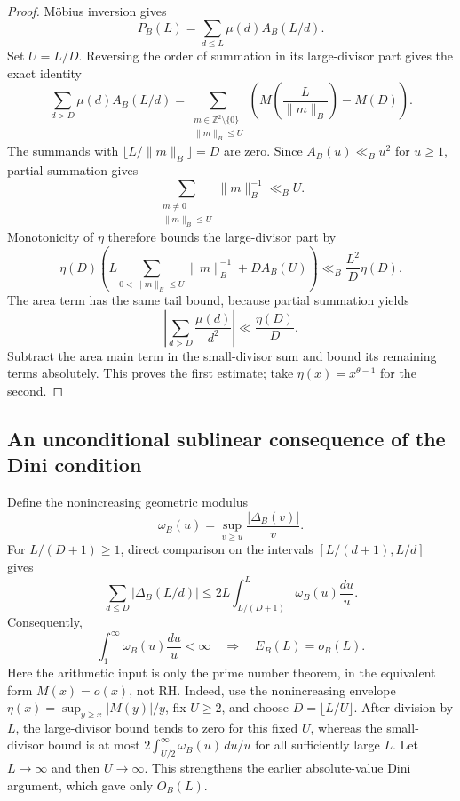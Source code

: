 \begin{proof}
M\"obius inversion gives
\[
 P_B(L)=\sum_{d\le L}\mu(d)A_B(L/d).
\]
Set $U=L/D$.  Reversing the order of summation in its large-divisor
part gives the exact identity
\[
 \sum_{d>D}\mu(d)A_B(L/d)
   =\sum_{\substack{m\in\mathbb Z^2\setminus\{0\}\\\|m\|_B\le U}}
       \left(M\!\left(\frac{L}{\|m\|_B}\right)-M(D)\right).
\]
The summands with $\lfloor L/\|m\|_B\rfloor=D$ are zero.
Since $A_B(u)\ll_B u^2$ for $u\ge1$, partial summation gives
\[
 \sum_{\substack{m\ne0\\\|m\|_B\le U}}\|m\|_B^{-1}\ll_B U.
\]
Monotonicity of $\eta$ therefore bounds the large-divisor part by
\[
 \eta(D)\left(L\sum_{0<\|m\|_B\le U}\|m\|_B^{-1}
                      +D A_B(U)\right)
       \ll_B\frac{L^2}{D}\eta(D).
\]
The area term has the same tail bound, because partial summation yields
\[
 \left|\sum_{d>D}\frac{\mu(d)}{d^2}\right|
       \ll\frac{\eta(D)}{D}.
\]
Subtract the area main term in the small-divisor sum and bound its
remaining terms absolutely.  This proves the first estimate; take
$\eta(x)=x^{\theta-1}$ for the second.
\end{proof}

\subsection{An unconditional sublinear consequence of the Dini condition}
Define the nonincreasing geometric modulus
\[
 \omega_B(u)=\sup_{v\ge u}\frac{|\Delta_B(v)|}{v}.
\]
For $L/(D+1)\ge1$, direct comparison on the intervals
$[L/(d+1),L/d]$ gives
\begin{equation}\label{eq:primitiveRHmodulus}
 \sum_{d\le D}|\Delta_B(L/d)|
   \le 2L\int_{L/(D+1)}^L\omega_B(u)\frac{du}{u}.
\end{equation}
Consequently,
\begin{equation}\label{eq:primitiveDiniPNT}
 \int_1^\infty\omega_B(u)\frac{du}{u}<\infty
 \quad\Longrightarrow\quad E_B(L)=o_B(L).
\end{equation}
Here the arithmetic input is only the prime number theorem, in the
equivalent form $M(x)=o(x)$, not RH.  Indeed, use the nonincreasing
envelope $\eta(x)=\sup_{y\ge x}|M(y)|/y$, fix $U\ge2$, and choose
$D=\lfloor L/U\rfloor$.  After division by $L$, the large-divisor
bound tends to zero for this fixed $U$, whereas the small-divisor bound
is at most
$2\int_{U/2}^{\infty}\omega_B(u)\,du/u$ for all sufficiently large $L$.
Let $L\to\infty$ and then $U\to\infty$.
This strengthens the earlier absolute-value Dini argument, which gave
only $O_B(L)$.


